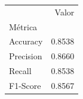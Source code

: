 \begin{tabular}{lr}
\toprule
 & Valor \\
Métrica &  \\
\midrule
Accuracy & 0.8538 \\
Precision & 0.8660 \\
Recall & 0.8538 \\
F1-Score & 0.8567 \\
\bottomrule
\end{tabular}